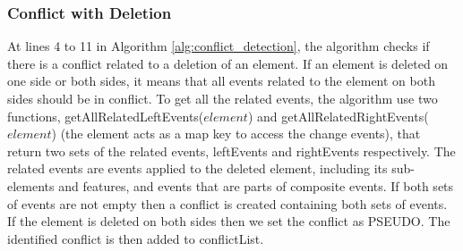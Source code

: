 \subsubsection{Conflict with Deletion} 
\label{sec:delete_conflict} 
At lines 4 to 11 in Algorithm \ref{alg:conflict_detection}, the algorithm checks if there is a conflict related to a deletion of an element.
If an element is deleted on one side or both sides, it means that all events related to the element on both sides should be in conflict. 
To get all the related events, the algorithm use two functions,  \textsf{getAllRelatedLeftEvents($element$)} and \textsf{getAllRelatedRightEvents($element$)} (the element acts as a map key to access the change events), that return two sets of the related events, 
\textsf{leftEvents} and \textsf{rightEvents} respectively. The related events are events applied to the deleted element, including its sub-elements and features, 
and events that are parts of composite events. If both sets of events are not empty then a conflict is created containing both sets of events. 
If the element is deleted on both sides then we set the conflict as \textsf{PSEUDO}. The identified conflict is then added to \textsf{conflictList}.

